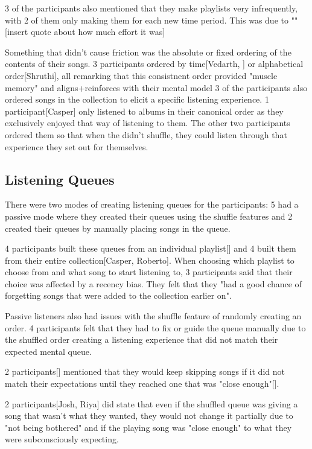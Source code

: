 3 of the participants also mentioned that they make playlists very infrequently, with 2 of them only making them for each new time period. This was due to ""[insert quote about how much effort it was]

Something that didn't cause friction was the absolute or fixed ordering of the contents of their songs. 3 participants ordered by time[Vedarth, ] or alphabetical order[Shruthi], all remarking that this consistnent order provided "muscle memory" and aligns+reinforces with their mental model
3 of the participants also ordered songs in the collection to elicit a specific listening experience. 1 participant[Casper] only listened to albums in their canonical order as they exclusively enjoyed that way of listening to them. The other two participants ordered them so that when the didn't shuffle, they could listen through that experience they set out for themselves.

\subsection{Listening Queues}
There were two modes of creating listening queues for the participants: 5 had a passive mode where they created their queues using the shuffle features and 2 created their queues by manually placing songs in the queue.

4 participants built these queues from an individual playlist[] and 4 built them from their entire collection[Casper, Roberto]. When choosing which playlist to choose from and what song to start listening to, 3 participants said that their choice was affected by a recency bias. They felt that they "had a good chance of forgetting songs that were added to the collection earlier on".

Passive listeners also had issues with the shuffle feature of randomly creating an order. 4 participants felt that they had to fix or guide the queue manually due to the shuffled order creating a listening experience that did not match their expected mental queue.

2 participants[] mentioned that they would keep skipping songs if it did not match their expectations until they reached one that was "close enough"[]. %

2 participants[Josh, Riya] did state that even if the shuffled queue was giving a song that wasn't what they wanted, they would not change it partially due to "not being bothered" and if the playing song was "close enough" to what they were subconsciously expecting.

